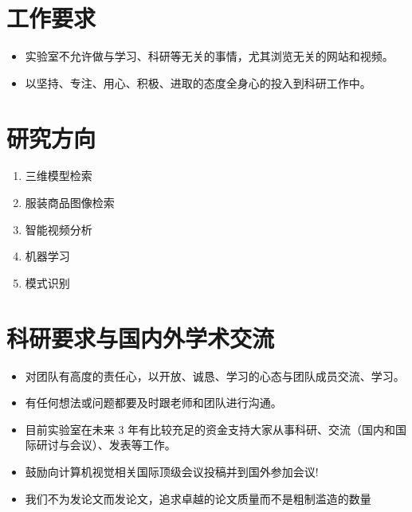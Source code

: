 \documentclass[a4paper，12pt]{article}
\begin{document}
\section{工作要求}

\begin{itemize}

\item 实验室不允许做与学习、科研等无关的事情，尤其浏览无关的网站和视频。

\item 以坚持、专注、用心、积极、进取的态度全身心的投入到科研工作中。

\end{itemize}

\section{研究方向}

\begin{enumerate}

\item 三维模型检索

\item 服装商品图像检索

\item 智能视频分析

\item 机器学习

\item 模式识别

\end{enumerate}

\section{科研要求与国内外学术交流}

\begin{itemize}

\item 对团队有高度的责任心，以开放、诚恳、学习的心态与团队成员交流、学习。

\item 有任何想法或问题都要及时跟老师和团队进行沟通。

\item 目前实验室在未来 3 年有比较充足的资金支持大家从事科研、交流（国内和国际研讨与会议）、发表等工作。

\item 鼓励向计算机视觉相关国际顶级会议投稿并到国外参加会议!

\item 我们不为发论文而发论文，追求卓越的论文质量而不是粗制滥造的数量

\end{itemize}
\end{document}
